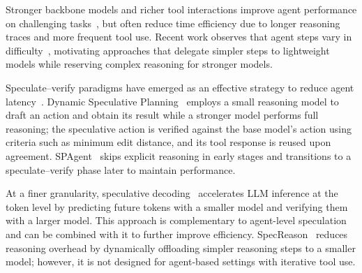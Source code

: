 Stronger backbone models and richer tool interactions improve agent performance on challenging tasks~\cite{shang2025rstar2}, but often reduce time efficiency due to longer reasoning traces and more frequent tool use.
Recent work observes that agent steps vary in difficulty~\cite{zhang2023ecoassistant,saha2024system}, motivating approaches that delegate simpler steps to lightweight models while reserving complex reasoning for stronger models.


Speculate--verify paradigms have emerged as an effective strategy to reduce agent latency~\cite{ye2025speculative,guan2025dynamic,hua2024interactive,wang2025accelerating}.
Dynamic Speculative Planning~\cite{guan2025dynamic} employs a small reasoning model to draft an action and obtain its result while a stronger model performs full reasoning; the speculative action is verified against the base model's action using criteria such as minimum edit distance, and its tool response is reused upon agreement.
SPAgent~\cite{huang2025reducing} skips explicit reasoning in early stages and transitions to a speculate--verify phase later to maintain performance.

At a finer granularity, speculative decoding~\cite{leviathan2023fast} accelerates LLM inference at the token level by predicting future tokens with a smaller model and verifying them with a larger model. 
This approach is complementary to agent-level speculation and can be combined with it to further improve efficiency. 
SpecReason~\cite{pan2025specreason} reduces reasoning overhead by dynamically offloading simpler reasoning steps to a smaller model; however, it is not designed for agent-based settings with iterative tool use.

